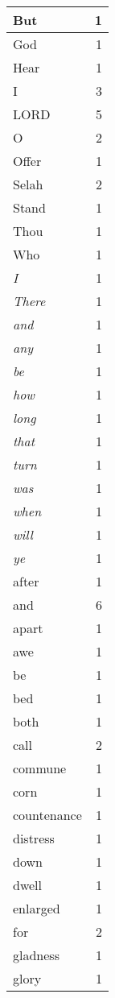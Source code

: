 \begin{center}
\begin{longtable}{l|r}
\hline \hline
\endlastfoot
But & 1 \\ \hline
God & 1 \\ \hline
Hear & 1 \\ \hline
I & 3 \\ \hline
LORD & 5 \\ \hline
O & 2 \\ \hline
Offer & 1 \\ \hline
Selah & 2 \\ \hline
Stand & 1 \\ \hline
Thou & 1 \\ \hline
Who & 1 \\ \hline
\emph{I} & 1 \\ \hline
\emph{There} & 1 \\ \hline
\emph{and} & 1 \\ \hline
\emph{any} & 1 \\ \hline
\emph{be} & 1 \\ \hline
\emph{how} & 1 \\ \hline
\emph{long} & 1 \\ \hline
\emph{that} & 1 \\ \hline
\emph{turn} & 1 \\ \hline
\emph{was} & 1 \\ \hline
\emph{when} & 1 \\ \hline
\emph{will} & 1 \\ \hline
\emph{ye} & 1 \\ \hline
after & 1 \\ \hline
and & 6 \\ \hline
apart & 1 \\ \hline
awe & 1 \\ \hline
be & 1 \\ \hline
bed & 1 \\ \hline
both & 1 \\ \hline
call & 2 \\ \hline
commune & 1 \\ \hline
corn & 1 \\ \hline
countenance & 1 \\ \hline
distress & 1 \\ \hline
down & 1 \\ \hline
dwell & 1 \\ \hline
enlarged & 1 \\ \hline
for & 2 \\ \hline
gladness & 1 \\ \hline
glory & 1 \\ \hline

\end{longtable}
\end{center}
